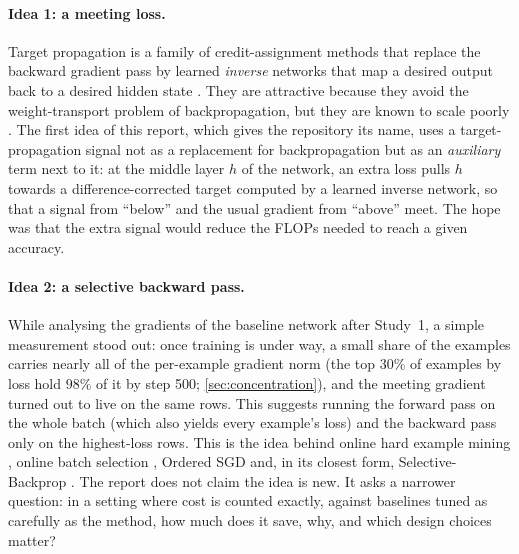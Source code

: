 \paragraph{Idea 1: a meeting loss.}
Target propagation is a family of credit-assignment methods that replace the backward gradient pass by learned \emph{inverse} networks that map a desired output back to a desired hidden state \citep{bengio2014auto,lee2015dtp}. They are attractive because they avoid the weight-transport problem of backpropagation, but they are known to scale poorly \citep{bartunov2018assessing,meulemans2020theoretical}. The first idea of this report, which gives the repository its name, uses a target-propagation signal not as a replacement for backpropagation but as an \emph{auxiliary} term next to it: at the middle layer $h$ of the network, an extra loss pulls $h$ towards a difference-corrected target computed by a learned inverse network, so that a signal from ``below'' and the usual gradient from ``above'' meet. The hope was that the extra signal would reduce the FLOPs needed to reach a given accuracy.

\paragraph{Idea 2: a selective backward pass.}
While analysing the gradients of the baseline network after Study~1, a simple measurement stood out: once training is under way, a small share of the examples carries nearly all of the per-example gradient norm (the top $30\%$ of examples by loss hold $98\%$ of it by step 500; \cref{sec:concentration}), and the meeting gradient turned out to live on the same rows. This suggests running the forward pass on the whole batch (which also yields every example's loss) and the backward pass only on the highest-loss rows. This is the idea behind online hard example mining \citep{shrivastava2016ohem}, online batch selection \citep{loshchilov2016online}, Ordered SGD \citep{kawaguchi2020ordered} and, in its closest form, Selective-Backprop \citep{jiang2019selective}. The report does not claim the idea is new. It asks a narrower question: in a setting where cost is counted exactly, against baselines tuned as carefully as the method, how much does it save, why, and which design choices matter?

